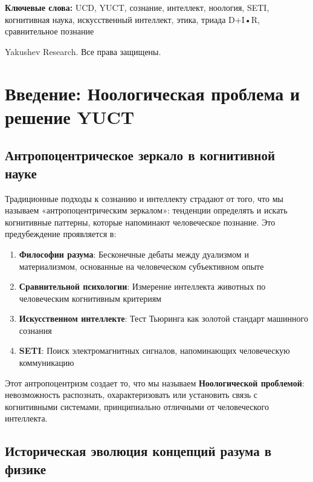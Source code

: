 \documentclass[12pt,a4paper]{article}
\begin{document}
\begin{titlepage}
\begin{center}
			\vspace{0cm}
			
			\noindent
			\small\textbf{Ключевые слова:} UCD, YUCT, сознание, интеллект, ноология, SETI, когнитивная наука, искусственный интеллект, этика, триада D+I•R, сравнительное познание
			
			\vspace{0.5cm}
			
			\noindent
			 Yakushev Research. Все права защищены.
		\end{center}
	\end{titlepage}
	
	\tableofcontents
	
	\newpage
	
	\section{Введение: Ноологическая проблема и решение YUCT}
	
	\subsection{Антропоцентрическое зеркало в когнитивной науке}
	
	Традиционные подходы к сознанию и интеллекту страдают от того, что мы называем «антропоцентрическим зеркалом»: тенденции определять и искать когнитивные паттерны, которые напоминают человеческое познание. Это предубеждение проявляется в:
	\begin{enumerate}
		\item \textbf{Философии разума}: Бесконечные дебаты между дуализмом и материализмом, основанные на человеческом субъективном опыте
		\item \textbf{Сравнительной психологии}: Измерение интеллекта животных по человеческим когнитивным критериям
		\item \textbf{Искусственном интеллекте}: Тест Тьюринга как золотой стандарт машинного сознания
		\item \textbf{SETI}: Поиск электромагнитных сигналов, напоминающих человеческую коммуникацию
	\end{enumerate}
	Этот антропоцентризм создает то, что мы называем \textbf{Ноологической проблемой}: невозможность распознать, охарактеризовать или установить связь с когнитивными системами, принципиально отличными от человеческого интеллекта.
	
	\subsection{Историческая эволюция концепций разума в физике}
	
\end{document}
